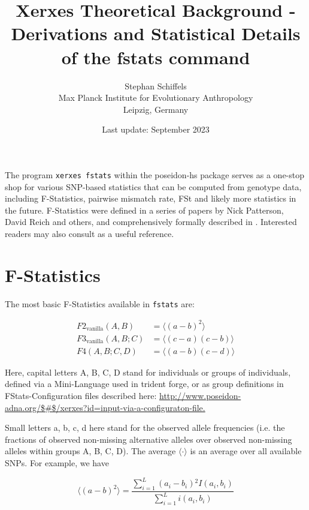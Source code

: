 \documentclass{article}
\begin{document}
\title{Xerxes Theoretical Background - Derivations and Statistical Details of the fstats command}
\author{Stephan Schiffels\\Max Planck Institute for Evolutionary Anthropology\\ Leipzig, Germany}
\date{Last update: September 2023}
\maketitle

The program \texttt{xerxes fstats} within the poseidon-hs package serves as a one-stop shop for various SNP-based statistics that can be computed from genotype data, including F-Statistics, pairwise mismatch rate, FSt and likely more statistics in the future. F-Statistics were defined in a series of papers by Nick Patterson, David Reich and others, and comprehensively formally described in \cite{Patterson2012-yq}. Interested readers may also consult \cite{Peter2016-ml} as a useful reference.

\section{F-Statistics}

The most basic F-Statistics available in \texttt{fstats} are:

\begin{align}
F2_\text{vanilla}(A, B) &= \langle(a-b)^2\rangle\\
F3_\text{vanilla}(A, B; C) &= \langle (c-a)(c-b) \rangle\\
F4(A, B; C, D) &= \langle (a-b)(c-d) \rangle
\end{align}

Here, capital letters A, B, C, D stand for individuals or groups of individuals, defined via a Mini-Language used in trident forge, or as group definitions in FStats-Configuration files described here: \url{http://www.poseidon-adna.org/$\#$/xerxes?id=input-via-a-configuraton-file.}

Small letters a, b, c, d here stand for the observed allele frequencies (i.e. the fractions of observed non-missing alternative alleles over observed non-missing alleles within groups A, B, C, D). The average \(\langle \cdot\rangle\) is an average over all available SNPs. For example, we have

\begin{equation}
\langle(a-b)^2\rangle=\frac{\sum _{i=1}^L \left(a_i-b_i\right){}^2 I\left(a_i,b_i\right)}{\sum _{i=1}^L i\left(a_i,b_i\right)}
\end{equation}
\end{document}
